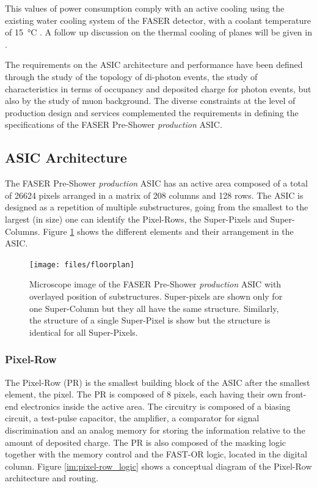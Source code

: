 		This values of power consumption comply with an active cooling using the existing water cooling system of the FASER detector, with a coolant temperature of \SI{15}{\celsius} \cite{PreShower_TP}. A follow up discussion on the thermal cooling of planes will be given in .
		
		
		The requirements on the ASIC architecture and performance have been defined through the study of the topology of di-photon events, the study of characteristics in terms of occupancy and deposited charge for photon events, but also by the study of muon background. The diverse constraints at the level of production design and services complemented the requirements in defining the specifications of the FASER Pre-Shower \textit{production} ASIC.   
		
		
		\subsection{ASIC Architecture}
		The FASER Pre-Shower \textit{production} ASIC has an active area composed of a total of 26624 pixels arranged in a matrix of 208 columns and 128 rows. The ASIC is designed as a repetition of multiple substructures, going from the smallest to the largest (in size) one can identify the Pixel-Rows, the Super-Pixels and Super-Columns. Figure \ref{im:prodASIC_floorplan} shows the different elements and their arrangement in the ASIC. 
		
		\begin{figure}[h]
			\centering
			\texttt{[image: files/floorplan]}
			\caption{Microscope image of the FASER Pre-Shower \textit{production} ASIC with overlayed position of substructures. Super-pixels are shown only for one Super-Column but they all have the same structure. Similarly, the structure of a single Super-Pixel is show but the structure is identical for all Super-Pixels.}
			\label{im:prodASIC_floorplan}
		\end{figure}
		 
			\subsubsection{Pixel-Row}
			The Pixel-Row (PR) is the smallest building block of the ASIC after the smallest element, the pixel. The PR is composed of 8 pixels, each having their own front-end electronics inside the active area. The circuitry is composed of a biasing circuit, a test-pulse capacitor, the amplifier, a comparator for signal discrimination and an analog memory for storing the information relative to the amount of deposited charge. The PR is also composed of the masking logic together with the memory control and the FAST-OR logic, located in the digital column. Figure \ref{im:pixel-row_logic} shows a conceptual diagram of the Pixel-Row architecture and routing. 
			
